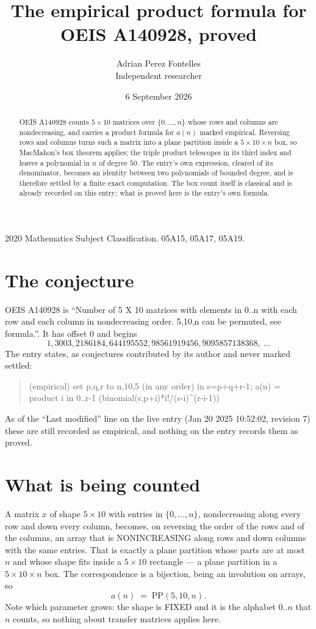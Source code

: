 \documentclass[11pt,a4paper]{article}
\title{The empirical product formula for OEIS A140928, proved}
\author{Adrian Perez Fontelles\\ \small Independent researcher}
\date{6 September 2026}
\theoremstyle{plain}
\theoremstyle{definition}
\begin{document}
\maketitle

\begin{abstract}
OEIS A140928 counts $5\times10$ matrices over $\{0,\dots,n\}$ whose rows and columns are
nondecreasing, and carries a product formula for $a(n)$ marked empirical. Reversing rows and
columns turns such a matrix into a plane partition inside a $5\times10\times n$ box, so
MacMahon's box theorem applies; the triple product telescopes in its third index and leaves a
polynomial in $n$ of degree $50$. The entry's own expression, cleared of its denominator,
becomes an identity between two polynomials of bounded degree, and is therefore settled by a
finite exact computation. The box count itself is classical and is already recorded on this
entry; what is proved here is the entry's own formula.
\end{abstract}

\noindent\small 2020 Mathematics Subject Classification. 05A15, 05A17, 05A19.\normalsize

\section{The conjecture}

OEIS A140928 is ``Number of 5 X 10 matrices with elements in 0..n with each row and each column in nondecreasing order. 5,10,n can be permuted, see formula.''. It has offset $0$ and begins
\[
1, 3003, 2186184, 644195552, 98561919456, 9095857138368,\ \dots
\]
The entry states, as conjectures contributed by its author and never marked settled:
\begin{quote}
(empirical) set p,q,r to n,10,5 (in any order) in s=p+q+r-1; a(n) = product {i in 0..r-1} (binomial(s,p+i)*i!/(s-i)\^{}(r-i-1))

\end{quote}
As of the ``Last modified'' line on the live entry (Jan 20 2025 10:52:02, revision 7) these are still
recorded as empirical, and nothing on the entry records them as proved.

\section{What is being counted}

A matrix $x$ of shape $5\times10$ with entries in $\{0,\dots,n\}$, nondecreasing along
every row and down every column, becomes, on reversing the order of the rows and of the
columns, an array that is NONINCREASING along rows and down columns with the same entries. That
is exactly a plane partition whose parts are at most $n$ and whose shape fits inside a
$5\times10$ rectangle --- a plane partition in a $5\times10\times n$ box. The
correspondence is a bijection, being an involution on arrays, so
\[
a(n)\;=\;\mathrm{PP}(5,10,n).
\]
Note which parameter grows: the shape is FIXED and it is the alphabet $0..n$ that $n$ counts,
so nothing about transfer matrices applies here.
\end{document}
